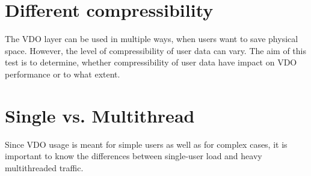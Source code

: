 \documentclass[
  color, %
  table, %
  lof,   %
  lot,   %
]{fithesis3}
\begin{document}
\section{Different compressibility}
The VDO layer can be used in multiple ways, when users want to save physical space. However, the level of compressibility of user data can vary. The aim of this test is to determine, whether compressibility of user data have impact on VDO performance or to what extent.

\section{Single vs. Multithread}
Since VDO usage is meant for simple users as well as for complex cases, it is important to know the differences between single-user load and heavy multithreaded traffic.
\end{document}
